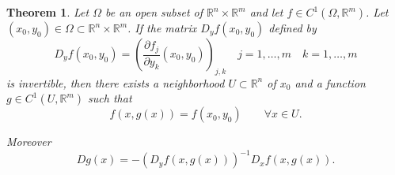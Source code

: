 \documentclass[12pt]{article}
\theoremstyle{plain}
\newtheorem*{thm*}{Theorem}
\begin{document}
\begin{thm*}
Let $\Omega$ be an open subset of $\mathbb{R}^n \times \mathbb{R}^m$
and let $f\in C^1(\Omega,\mathbb{R}^m)$. Let $(x_0,y_0)\in \Omega \subset \mathbb{R}^n\times\mathbb{R}^m$.
If the matrix $D_y f(x_0,y_0)$ defined by
\[
D_y f(x_0,y_0) = \left( \frac{\partial f_j}{\partial y_k}(x_0,y_0)\right)_{j,k}
\quad j=1,\ldots,m\quad k=1,\ldots,m
\]
is invertible, then there exists a neighborhood $U\subset \mathbb{R}^n$ of $x_0$
and a function $g \in C^1(U,\mathbb{R}^m)$ such that
\[
f(x,g(x)) = f(x_0,y_0) \qquad \forall x \in U.
\]

Moreover
\[
Dg(x) = - (D_y f(x,g(x))) ^ {-1} D_x f(x,g(x)).
\]
\end{thm*}
\end{document}
